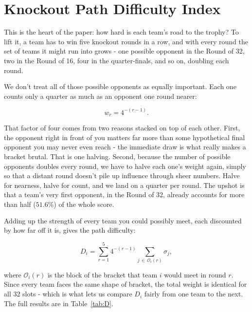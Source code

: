\documentclass[11pt]{article}
\newcommand{\Dif}{D}                 %
\newcommand{\str}{\sigma}            %
\newcommand{\wt}{w}                  %
\newcommand{\Opp}[2]{\mathcal{O}_{#1}(#2)} %
\begin{document}
\FloatBarrier
\section{Knockout Path Difficulty Index}
\label{sec:index}

This is the heart of the paper: how hard is each team's road to the trophy? To lift it, a team has to win five knockout rounds in a row, and with every round the set of teams it might run into grows - one possible opponent in the Round of 32, two in the Round of 16, four in the quarter-finals, and so on, doubling each round.

We don't treat all of those possible opponents as equally important. Each one counts only a quarter as much as an opponent one round nearer:

\begin{equation}
\wt_r = 4^{-(r-1)} .
\label{eq:weights}
\end{equation}

That factor of four comes from two reasons stacked on top of each other. First, the opponent right in front of you matters far more than some hypothetical final opponent you may never even reach - the immediate draw is what really makes a bracket brutal. That is one halving. Second, because the number of possible opponents doubles every round, we have to halve each one's weight again, simply so that a distant round doesn't pile up influence through sheer numbers. Halve for nearness, halve for count, and we land on a quarter per round. The upshot is that a team's very first opponent, in the Round of 32, already accounts for more than half ($51.6\%$) of the whole score.

Adding up the strength of every team you could possibly meet, each discounted by how far off it is, gives the path difficulty:

\begin{equation}
\Dif_i = \sum_{r=1}^{5} 4^{-(r-1)} \sum_{j\,\in\,\Opp{i}{r}} \str_j ,
\label{eq:pathdiff}
\end{equation}

where $\Opp{i}{r}$ is the block of the bracket that team $i$ would meet in round $r$. Since every team faces the same shape of bracket, the total weight is identical for all 32 slots - which is what lets us compare $\Dif_i$ fairly from one team to the next. The full results are in Table~\ref{tab:D}.
\end{document}
